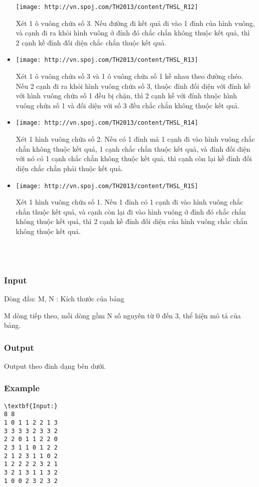 \begin{itemize}
\texttt{[image: http://vn.spoj.com/TH2013/content/THSL\_R12]} 

Xét 1 ô vuông chứa số 3. Nếu đường đi kết quả đi vào 1 đỉnh của hình vuông, và cạnh đi ra khỏi hình vuông ở đỉnh đó chắc chắn không thuộc kết quả, thì 2 cạnh kề đỉnh đối diện chắc chắn thuộc kết quả.
	\item 


\texttt{[image: http://vn.spoj.com/TH2013/content/THSL\_R13]} 

Xét 1 ô vuông chứa số 3 và 1 ô vuông chứa số 1 kề nhau theo đường chéo. Nếu 2 cạnh đi ra khỏi hình vuông chứa số 3, thuộc đỉnh đối diện với đỉnh kề với hình vuông chứa số 1 đều bị chặn, thì 2 cạnh kề với đỉnh thuộc hình vuông chứa số 1 và đối diện với số 3 đều chắc chắn không thuộc kết quả.
	\item 


\texttt{[image: http://vn.spoj.com/TH2013/content/THSL\_R14]} 

Xét 1 hình vuông chứa số 2. Nếu có 1 đỉnh mà 1 cạnh đi vào hình vuông chắc chắn không thuộc kết quả, 1 cạnh chắc chắn thuộc kết quả, và đỉnh đối diện với nó có 1 cạnh chắc chắn không thuộc kết quả, thì cạnh còn lại kề đỉnh đối diện chắc chắn phải thuộc kết quả.
	\item 


\texttt{[image: http://vn.spoj.com/TH2013/content/THSL\_R15]} 

Xét 1 hình vuông chứa số 1. Nếu 1 đỉnh có 1 cạnh đi vào hình vuông chắc chắn thuộc kết quả, và cạnh còn lại đi vào hình vuông ở đỉnh đó chắc chắn không thuộc kết quả, thì 2 cạnh kề đỉnh đối diện của hình vuông chắc chắn không thuộc kết quả.
\\ 
\end{itemize}

 

\subsubsection{Input}

Dòng đầu: M, N : Kích thước của bảng

M dòng tiếp theo, mỗi dòng gồm N số nguyên từ 0 đến 3, thể hiện mô tả của bảng.

\subsubsection{Output}

Output theo đinh dạng bên dưới.

\subsubsection{Example}
\begin{verbatim}
\textbf{Input:}
8 8
1 0 1 1 2 2 1 3
3 3 3 3 2 3 3 2
2 2 0 1 1 2 2 0
2 3 1 1 0 1 2 2
2 1 2 3 1 1 0 2
1 2 2 2 2 3 2 1
3 2 1 3 1 1 3 2
1 0 0 2 3 2 3 2\end{verbatim}

